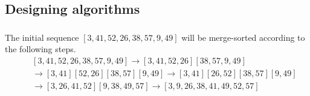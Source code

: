 \subsection{Designing algorithms}

\subsubsection{}
    The initial sequence $[3, 41, 52, 26, 38, 57, 9, 49]$ will be merge-sorted according to the following steps.
    \begin{eqnarray}
        \nonumber &\,& [3, 41, 52, 26, 38, 57, 9, 49] \to 
            [3, 41, 52, 26] [38, 57, 9, 49]
        \\ \nonumber &\,& \to
        [3, 41] [52, 26] [38, 57] [9, 49] \to
        [3, 41] [26, 52] [38, 57] [9, 49]
        \\ \nonumber &\,& \to
        [3, 26, 41, 52] [9, 38, 49, 57] \to
        [3, 9, 26, 38, 41, 49, 52, 57]
    \end{eqnarray}
